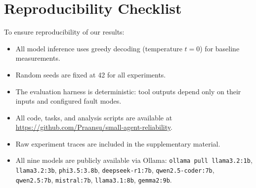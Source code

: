\section{Reproducibility Checklist}
\label{app:reproducibility}

To ensure reproducibility of our results:
\begin{itemize}[nosep]
    \item All model inference uses greedy decoding (temperature $t = 0$) for baseline measurements.
    \item Random seeds are fixed at 42 for all experiments.
    \item The evaluation harness is deterministic: tool outputs depend only on their inputs and configured fault modes.
    \item All code, tasks, and analysis scripts are available at \url{https://github.com/Praansu/small-agent-reliability}.
    \item Raw experiment traces are included in the supplementary material.
    \item All nine models are publicly available via Ollama: \texttt{ollama pull llama3.2:1b}, \texttt{llama3.2:3b}, \texttt{phi3.5:3.8b}, \texttt{deepseek-r1:7b}, \texttt{qwen2.5-coder:7b}, \texttt{qwen2.5:7b}, \texttt{mistral:7b}, \texttt{llama3.1:8b}, \texttt{gemma2:9b}.
\end{itemize}
